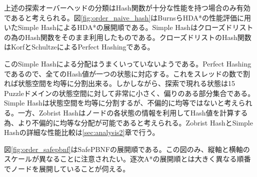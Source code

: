 \documentclass[uplatex]{jsarticle}
\begin{document}
上述の探索オーバーヘッドの分類はHash関数が十分な性能を持つ場合のみ有効であると考えられる。図\ref{fig:order_naive_hash}はBurnsらHDA*の性能評価に用いたSimple HashによるHDA*の展開順である。Simple Hashはクローズドリストの為のHash関数をそのまま利用したものである。クローズドリストのHash関数はKorfとSchultzeによるPerfect Hashingである\cite{korf2005large}。

このSimple Hashによる分配はうまくいっていないようである。Perfect Hashingであるので、全てのHash値が一つの状態に対応する。これをスレッドの数で割れば状態空間を均等に分割出来る。しかしながら、探索で現れる状態は15 Puzzleドメインの状態空間に対して非常に小さく、偏りのある部分集合である。Simple Hashは状態空間を均等に分割するが、不偏的に均等ではないと考えられる。一方、Zobrist Hashはノードの各状態の情報を利用してHash値を計算する為、より不偏的に均等な分配が可能であると考えられる。Zobrist HashとSimple Hashの詳細な性能比較は\ref{sec:analysis2}章で行う。

\begin{comment}
状態$s$は整数列$\mathbf{x} = (x_{0}, x_{1}, …, x_{n})$で表せられるとする。Simple Hashは状態$s$をに対して以下の式で与えられる。
\newline
\begin{equation}
	H(s) = \sum\nolimits_{i = 0}^{n}x_{i} l_{i}
\end{equation}

Simple Hash分配はうまくいっていないようである。
15 Puzzleドメインの場合、$x_{i}$は各タイルの位置を表し、$l_{i}$は全て16である。スレッドの数が2, 4, 8, 16の場合、Simple Hashは15 Puzzleドメインの状態空間を均等に分割する。しかしながら、この時Hash値は$x_{0}$の値のみに依存する。状態の一部分の情報しか利用していない為、状態空間に対して\textbf{不偏的に}均等な分割をすることが出来ない。探索で現れる状態は15 Puzzleドメインの状態空間に対して非常に小さく、偏りのある部分集合である。よって、Simple HashはA*探索で現れるノードを均等に分配することは出来ないと考えられる。Zobrist HashとSimple Hashの詳細な性能比較は\ref{sec:analysis2}章で行う。
\newline
\end{comment}


図\ref{fig:order_safepbnf}はSafePBNFの展開順である。この図のみ、縦軸と横軸のスケールが異なることに注意されたい。逐次A*の展開順とは大きく異なる順番でノードを展開していることが伺える。
\newline
\end{document}

